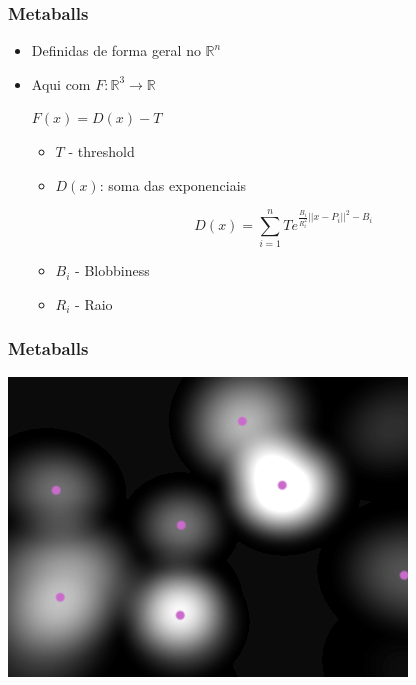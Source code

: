 \documentclass[brazil]{beamer}
\begin{document}
    \begin{frame}
      \frametitle{Metaballs}
      \begin{itemize}
        \item Definidas de forma geral no $\mathbb{R}^n$
        \item Aqui com $F:\mathbb{R}^3 \to \mathbb{R}$
        \vspace{.5em}
        \begin{center}
          $F(x) = D(x) - T$
        \end{center}
        \begin{itemize}
          \item $T$ - threshold
          \item $D(x)$: soma das exponenciais
            \vspace{-1.0em}
            \begin{center}
              $$D(x) = \sum_{i = 1}^n Te^{\frac{B_i}{R_i^2}||x-P_i||^2-B_i} $$
            \end{center}
          \item $B_i$ - Blobbiness
          \item $R_i$ - Raio
        \end{itemize}
      \end{itemize}
    \end{frame}
      
    \begin{frame}
      \frametitle{Metaballs}
        \begin{center}
          \includegraphics[width=.7\textwidth]{imgs/metaball-2d-1.png}
        \end{center}
    \end{frame}
\end{document}
